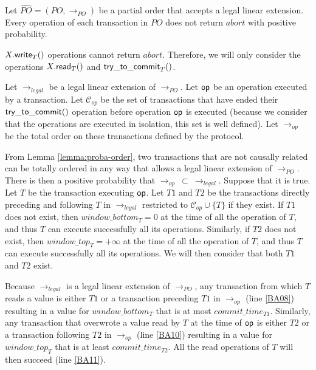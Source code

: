   

\begin{lemma}
\label{lemma:proba-succeed}
Let $\widehat{PO} = (PO,\rightarrow_{PO})$ be a partial order that
accepts a legal linear extension. Every operation   
of each transaction in $PO$
does not return $abort$ with positive probability. 
\end{lemma}
\begin{proofL}
$X.{\sf write}_T()$  operations cannot return $abort$. Therefore,  
we  will  only  consider   the  operations  $X.{\sf  read}_T()$   and  ${\sf
try\_to\_commit}_T()$.

Let $\rightarrow_{legal}$ be a legal linear extension of $\rightarrow_{PO}$.
Let $\sf op$ be an operation executed by a transaction.
Let $\mathcal{C}_{op}$ be the set of transactions that have ended their 
$\sf try\_to\_commit()$ 
operation before operation $\sf op$ is executed (because we consider 
that the operations
are executed in isolation, this set is well defined).  Let $\rightarrow_{op}$
be the total order on these transactions defined by the protocol.

From Lemma \ref{lemma:proba-order}, 
two transactions that are not causally related can be totally ordered in any 
way that allows a legal linear extension of $\rightarrow_{PO}$.
There is then  a positive probability that 
 $\rightarrow_{op}~ \subset ~\rightarrow_{legal}$.
Suppose that it is true. Let $T$ be the transaction executing $\sf op$.
Let $T1$ and $T2$ be the transactions directly preceding and following $T$ 
in $\rightarrow_{legal}$ restricted to $\mathcal{C}_{op} \cup \{T\}$ 
if they exist.
If $T1$ does not exist, then $window\_bottom_T = 0$ at the time of all the 
operation of $T$, and thus $T$ can execute successfully all its operations.
Similarly, if $T2$ does not exist, then $window\_top_T = +\infty$ 
at the time of all the 
operation of $T$, and thus $T$ can execute successfully all its operations.
We will then consider that both $T1$ and $T2$ exist.


Because $\rightarrow_{legal}$ is a legal linear extension of 
$\rightarrow_{PO}$, any transaction from which $T$ reads a value is 
either $T1$ or a transaction preceding $T1$ in 
$\rightarrow_{op}$ (line \ref{BA08})
resulting in a value for $window\_bottom_T$ that is at most $commit\_time_{T1}$. 
Similarly, any transaction that 
overwrote a value  read by $T$
at the time of $\sf op$ is either $T2$ or a transaction following 
$T2$ in $\rightarrow_{op}$ (line \ref{BA10})
resulting in a value for $window\_top_T$ that is at least $commit\_time_{T2}$. 
All the read operations 
of $T$ will then succeed (line \ref{BA11}).


\end{proofL}
